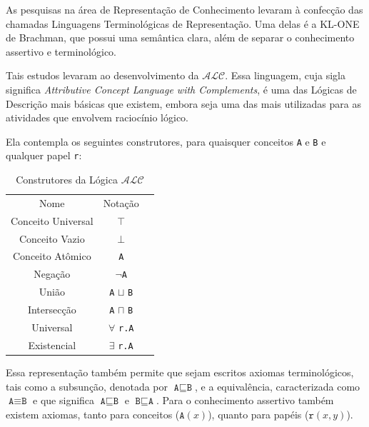 As pesquisas na área de Representação de Conhecimento levaram à confecção das chamadas Linguagens Terminológicas de Representação. Uma delas é a KL-ONE de Brachman, que possui uma semântica clara, além de separar o conhecimento assertivo e terminológico. %

Tais estudos levaram ao desenvolvimento da $\mathcal{ALC}$. Essa linguagem, cuja sigla significa \textit{Attributive Concept Language with Complements}, é uma das Lógicas de Descrição mais básicas que existem, embora seja uma das mais utilizadas para as atividades que envolvem raciocínio lógico. 

Ela contempla os seguintes construtores, para quaisquer conceitos \texttt{A} e \texttt{B} e qualquer papel \texttt{r}:

\begin{table}[H]
	\centering
	\begin{tabular}{|c|c|l}
		\cline{1-2}
		Nome               & Notação                          &  \\ \cline{1-2}
		Conceito Universal & $ \top $                         &  \\ \cline{1-2}
		Conceito Vazio     & $ \bot $                         &  \\ \cline{1-2}
		Conceito Atômico   & \texttt{A}                       &  \\ \cline{1-2}
		Negação            & $ \neg $\texttt{A}               &  \\ \cline{1-2}
		União              & \texttt{A} $ \sqcup $ \texttt{B} &  \\ \cline{1-2}
		Intersecção        & \texttt{A} $ \sqcap $ \texttt{B} &  \\ \cline{1-2}
		Universal          & $\forall$ \texttt{r.A}           &  \\ \cline{1-2}
		Existencial        & $\exists$ \texttt{r.A}           &  \\ \cline{1-2}
	\end{tabular}
	\caption{Construtores da Lógica $ \mathcal{ALC} $}
\end{table}

Essa representação também permite que sejam escritos axiomas terminológicos, tais como a subsunção, denotada por $ \texttt{A} \sqsubseteq \texttt{B} $, e a equivalência, caracterizada como $ \texttt{A} \equiv \texttt{B} $ e que significa $ \texttt{A} \sqsubseteq \texttt{B} $ e $ \texttt{B} \sqsubseteq \texttt{A} $. Para o conhecimento assertivo também existem axiomas, tanto para conceitos ($\texttt{A}(x)$), quanto para papéis ($\texttt{r}(x,y)$).

